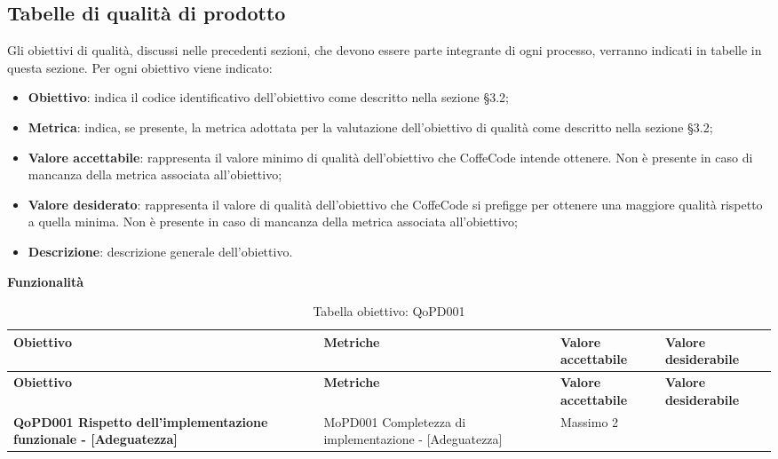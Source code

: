 \documentclass[../piano-di-qualifica.tex]{subfiles}
\begin{document}
\subsection{Tabelle di qualità di prodotto}
\label{sub:tabelle_di_qualita_di_prodotto}
Gli obiettivi di qualità, discussi nelle precedenti sezioni, che devono essere parte integrante di ogni processo, verranno indicati in tabelle in questa sezione.
Per ogni obiettivo viene indicato:

\begin{itemize}
   \item \textbf{Obiettivo}: indica il codice identificativo dell'obiettivo come descritto nella sezione §3.2;
   \item \textbf{Metrica}: indica, se presente, la metrica adottata per la valutazione dell'obiettivo di qualità come descritto nella sezione §3.2;
   \item \textbf{Valore accettabile}: rappresenta il valore minimo di qualità dell'obiettivo che CoffeCode intende ottenere. Non è presente in caso di mancanza della metrica associata all'obiettivo;
   \item \textbf{Valore desiderato}: rappresenta il valore di qualità dell'obiettivo che CoffeCode si prefigge per ottenere una maggiore qualità rispetto a quella minima. Non è presente in caso di mancanza della metrica associata all'obiettivo;
   \item \textbf{Descrizione}: descrizione generale dell'obiettivo.
\end{itemize}

\begin{center}
    \centering
    \textbf{Funzionalità}
\end{center}

\renewcommand{\arraystretch}{2} %
\begin{longtable}[H]{>{\centering\bfseries}m{5cm} >{\centering}m{5cm} >{\centering}m{2.5cm} >{\centering\arraybackslash}m{2.5cm}}  
    \caption{Tabella obiettivo: QoPD001}%
    \label{tab:obiettivo_qopd001} \\
  \rowcolor{lightgray}
  {\textbf{Obiettivo}} & {\textbf{Metriche}} & {\textbf{Valore accettabile}} & {\textbf{Valore desiderabile}}  \\
  \endfirsthead%
  \rowcolor{lightgray}
  {\textbf{Obiettivo}} & {\textbf{Metriche}} & {\textbf{Valore accettabile}} & {\textbf{Valore desiderabile}}  \\
  \endhead%
  \textbf{QoPD001 Rispetto dell’implementazione funzionale - {[}Adeguatezza{]}} & MoPD001 Completezza di implementazione - {[}Adeguatezza{]} & Massimo 2 & 0 \\
\end{longtable}
\end{document}
